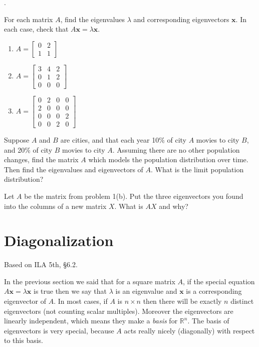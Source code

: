 \documentclass[11pt,oneside]{amsbook}
\newcommand{\R}{\mathbb R}
\theoremstyle{definition}
\theoremstyle{plain}
\theoremstyle{definition}
\theoremstyle{remark}
\numberwithin{equation}{section}
\numberwithin{figure}{section}
\newcounter{activityitem}
\newenvironment{activity}{\begin{list}{\arabic{activityitem}.}{\usecounter{activityitem}\setlength{\itemsep}{.2in}}}{\end{list}}
\begin{document}
\begin{activity}
  \item For each matrix $A$, find the eigenvalues $\lambda$ and corresponding eigenvectors $\mathbf{x}$. In each case, check that $A\mathbf{x}=\lambda\mathbf{x}$.
  \begin{enumerate}
    \item $A=\begin{bmatrix}0&2\\1&1\end{bmatrix}$
    \item $A=\begin{bmatrix}
      3 & 4 & 2 \\
      0 & 1 & 2 \\
      0 & 0 & 0
      \end{bmatrix}$
    \item $A=\begin{bmatrix}
      0 & 2 & 0 & 0 \\
      2 & 0 & 0 & 0 \\
      0 & 0 & 0 & 2 \\
      0 & 0 & 2 & 0
    \end{bmatrix}$
  \end{enumerate}
  \item Suppose $A$ and $B$ are cities, and that each year 10\% of city $A$ movies to city $B$, and 20\% of city $B$ movies to city $A$. Assuming there are no other population changes, find the matrix $A$ which models the population distribution over time. Then find the eigenvalues and eigenvectors of $A$. What is the limit population distribution?
  \item Let $A$ be the matrix from problem 1(b). Put the three eigenvectors you found into the columns of a new matrix $X$. What is $AX$ and why?
\end{activity}


\newpage
\section{Diagonalization}

Based on ILA 5th, \S 6.2.

In the previous section we said that for a square matrix $A$, if the special equation $A\mathbf{x}=\lambda\mathbf{x}$ is true then we say that $\lambda$ is an eigenvalue and $\mathbf{x}$ is a corresponding eigenvector of $A$. In most cases, if $A$ is $n\times n$ then there will be exactly $n$ distinct eigenvectors (not counting scalar multiples). Moreover the eigenvectors are linearly independent, which means they make a \emph{basis} for $\R^n$. The basis of eigenvectors is very special, because $A$ acts really nicely (diagonally) with respect to this basis.
\end{document}
